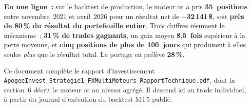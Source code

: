 \documentclass[11pt, a4paper]{scrartcl}
\begin{document}
\vspace{0.8cm}

\begin{thesisbox}
\textbf{En une ligne~:} sur le backtest de production, le moteur or a pris
\textbf{35~positions} entre novembre~2021 et avril~2026 pour un résultat net de
\textbf{$+$32\,141\,\$}, soit \textbf{près de 80\,\% du résultat du portefeuille
entier}. Trois chiffres résument le mécanisme~: \textbf{31\,\% de trades
gagnants}, un gain moyen \textbf{8,5~fois} supérieur à la perte moyenne, et
\textbf{cinq positions de plus de 100~jours} qui produisent à elles seules
\emph{plus} que le résultat total. Le portage en prélève \textbf{28\,\%}.
\end{thesisbox}

\vspace{0.4cm}

{\small\color{slateGrey}\sffamily
Ce document complète le rapport d'investissement \texttt{ApogeeInvest\_Strategie1\_FXMultiMoteurs\_RapportTechnique.pdf}, dont la
section~6 décrit le moteur or au niveau agrégé. Il descend ici au trade
individuel, à partir du journal d'exécution du backtest MT5 publié.}

\clearpage

\tableofcontents
\clearpage










\end{document}
